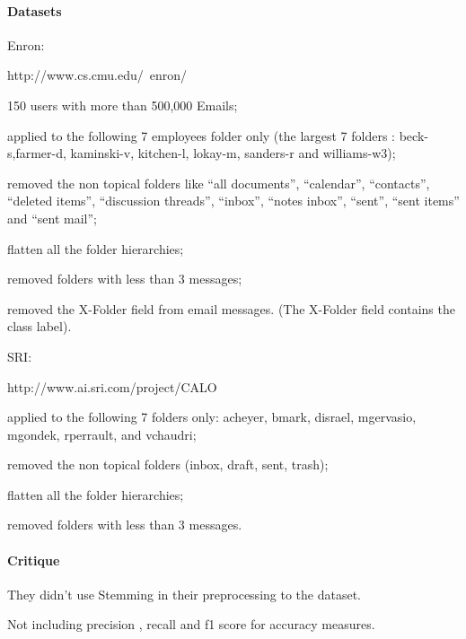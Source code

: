 \documentclass[12pt]{article}
\newenvironment{my_itemize}
{\begin{itemize}
  \setlength{\itemsep}{0cm}
  \setlength{\parskip}{0cm}}
{\end{itemize}}
\begin{document}
\paragraph{Datasets}
    \begin{my_itemize}
    \item Enron:
    \begin{my_itemize}
	\item http://www.cs.cmu.edu/~enron/
        \item 150 users with more than 500,000 Emails;
        \item applied to the following 7 employees folder only 
	      (the largest 7 folders : beck-s,farmer-d, kaminski-v, 
	      kitchen-l, lokay-m, sanders-r and williams-w3);
        \item removed the non topical folders like ``all documents'', 
	      ``calendar'', ``contacts'', ``deleted items'', ``discussion threads'', 
	      ``inbox'', ``notes inbox'', ``sent'', ``sent items'' and ``sent mail'';
        \item flatten all the folder hierarchies;
        \item removed folders with less than 3 messages;
        \item removed the X-Folder field from email messages. (The X-Folder 
	      field contains the class label).
    \end{my_itemize}
    \item SRI:
    \begin{my_itemize}
	\item http://www.ai.sri.com/project/CALO
        \item applied to the following 7 folders only: acheyer, bmark, disrael, 
	      mgervasio, mgondek, rperrault, and vchaudri;
        \item removed the non topical folders (inbox, draft, sent, trash);
        \item flatten all the folder hierarchies;
        \item removed folders with less than 3 messages.
    \end{my_itemize}
\end{my_itemize}

\paragraph{Critique}
\begin{my_itemize}
    \item They didn’t use Stemming in their preprocessing to the dataset.
    \item Not including precision , recall and f1 score for accuracy measures.
\end{my_itemize}
\end{document}
